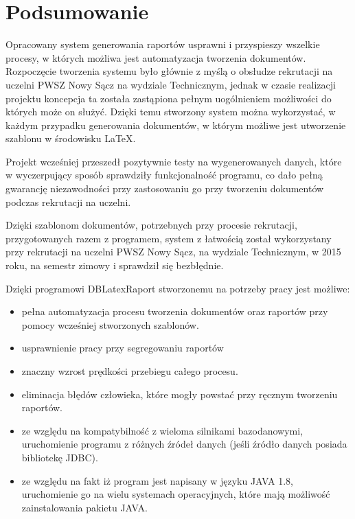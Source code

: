 \chapter{Podsumowanie}
Opracowany system generowania raportów usprawni i przyspieszy wszelkie procesy, w których możliwa jest automatyzacja tworzenia dokumentów. Rozpoczęcie tworzenia systemu było głównie z myślą o obsłudze rekrutacji na uczelni PWSZ Nowy Sącz na wydziale Technicznym, jednak w czasie realizacji projektu koncepcja ta została zastąpiona pełnym uogólnieniem możliwości do których może on służyć. Dzięki temu stworzony system można wykorzystać, w każdym przypadku generowania dokumentów, w którym możliwe jest utworzenie szablonu w środowisku LaTeX.
\vspace{5mm}
\par
Projekt wcześniej przeszedł pozytywnie testy na wygenerowanych danych, które w wyczerpujący sposób sprawdziły funkcjonalność programu, co dało pełną gwarancję niezawodności przy zastosowaniu go przy tworzeniu dokumentów podczas rekrutacji na uczelni.
\vspace{5mm} 
\par
Dzięki szablonom dokumentów, potrzebnych przy procesie rekrutacji, przygotowanych razem z programem, system z łatwością został wykorzystany przy rekrutacji na uczelni PWSZ Nowy Sącz, na wydziale Technicznym, w 2015 roku, na semestr zimowy i sprawdził się bezbłędnie. 
\vspace{5mm}
\par
Dzięki programowi DBLatexRaport stworzonemu na potrzeby pracy jest możliwe:\vspace{5mm}
\begin{itemize}
\item pełna automatyzacja procesu tworzenia dokumentów oraz raportów przy pomocy wcześniej stworzonych szablonów.\vspace{5mm}
\item usprawnienie pracy przy segregowaniu raportów\vspace{5mm}
\item znaczny wzrost prędkości przebiegu całego procesu.\vspace{5mm}
\item eliminacja błędów człowieka, które mogły powstać przy ręcznym tworzeniu raportów.\vspace{5mm}
\item ze względu na kompatybilność z wieloma silnikami bazodanowymi, uruchomienie programu z różnych źródeł danych (jeśli źródło danych posiada bibliotekę JDBC).\vspace{5mm}
\item ze względu na fakt iż program jest napisany w języku JAVA 1.8, uruchomienie go na wielu systemach operacyjnych, które mają możliwość zainstalowania pakietu JAVA.\vspace{5mm}
\end{itemize}\vspace{5mm}
